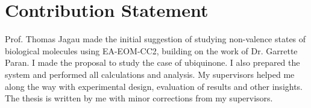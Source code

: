 \chapter*{Contribution Statement}

Prof. Thomas Jagau made the initial suggestion of studying non-valence states of biological molecules using EA-EOM-CC2, building on the work of Dr. Garrette Paran. I made the proposal to study the case of ubiquinone. I also prepared the system and performed all calculations and analysis. My supervisors helped me along the way with experimental design, evaluation of results and other insights. The thesis is written by me with minor corrections from my supervisors.